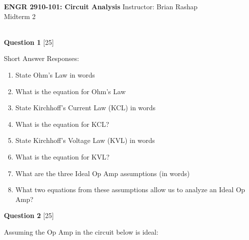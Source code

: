 \documentclass[12pt]{article}
\begin{document}
\begin{center}
\hfil
{\large\bf {ENGR 2910-101: Circuit Analysis}}
\hfill Instructor: Brian Rashap\\
Midterm 2  \hfill \\
\hrulefill\\
\end{center}

{\bf Question 1} [25]

Short Answer Responses:
\begin{enumerate}
\item State Ohm's Law in words

\vspace{1cm}

\item What is the equation for Ohm's Law

\vspace{1cm}

\item State Kirchhoff's Current Law (KCL) in words

\vspace{1cm}

\item What is the equation for KCL?

\vspace{1cm}

\item State Kirchhoff's Voltage Law (KVL) in words

\vspace{1cm}

\item What is the equation for KVL?

\vspace{1cm}

\item What are the three Ideal Op Amp assumptions (in words)

\vspace{3cm}

\item What two equations from these assumptions allow us to analyze an Ideal Op Amp?

\vspace{1cm}


\end{enumerate}

\newpage
{\bf Question 2} [25]
\newline

Assuming the Op Amp in the circuit below is ideal:
\end{document}
